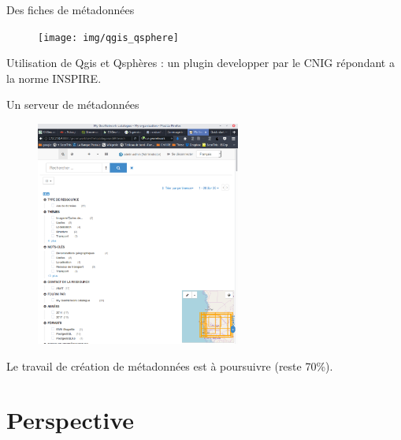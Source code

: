 \documentclass[newPxFont]{beamer}
\begin{document}
\begin{frame}[c]{Des fiches de métadonnées}
\vspace{-2em}
\begin{figure}
	\centering
	\texttt{[image: img/qgis\_qsphere]}
\end{figure}
Utilisation de Qgis et Qsphères : un plugin developper par le CNIG répondant a la
norme INSPIRE.
\end{frame}

\begin{frame}[c]{Un serveur de métadonnées}
\vspace{-2em}
\begin{figure}
	\centering
	\includegraphics[width = 0.6\textwidth]{img/geonetwork}
\end{figure}
Le travail de création de métadonnées est à poursuivre (reste 70\%).
\end{frame}

\section{Perspective}
\end{document}
